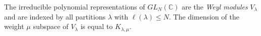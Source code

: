 \documentclass[11pt]{amsart}
\newcommand{\darkblue}{\color{darkblue}}
\newcommand{\defn}[1]{\emph{\darkblue #1}}
\theoremstyle{plain}
\theoremstyle{definition}
\numberwithin{equation}{section}
\newcommand{\la}{\lambda}
\newcommand{\al}{\alpha}
\def\la{\lambda}
\begin{document}
% 
  

The irreducible polynomial representations of  $GL_N(\mathbb{C})$ are the \defn{Weyl modules} $V_\la$ and are indexed by all partitions $\lambda$ with $\ell(\la) \leq N$. The dimension of the weight $\mu$ subspace of $V_\la$ is equal to $K_{\la,\mu}$. 
\end{document}
